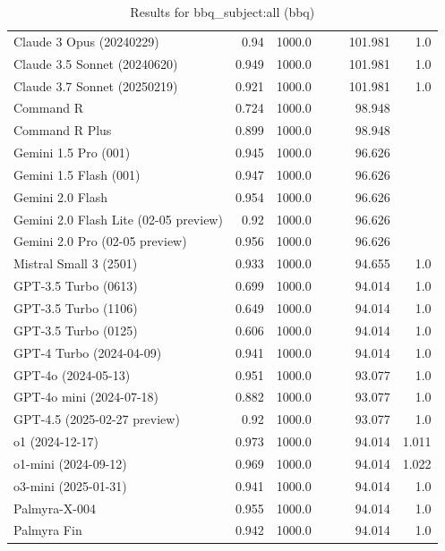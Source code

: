 \begin{table}[htp]
{\begin{tabular}{lrrrrrr}
Claude 3 Opus (20240229) & 0.94 & 1000.0 &  &  & 101.981 & 1.0 \\
Claude 3.5 Sonnet (20240620) & 0.949 & 1000.0 &  &  & 101.981 & 1.0 \\
Claude 3.7 Sonnet (20250219) & 0.921 & 1000.0 &  &  & 101.981 & 1.0 \\
Command R & 0.724 & 1000.0 &  &  & 98.948 &  \\
Command R Plus & 0.899 & 1000.0 &  &  & 98.948 &  \\
Gemini 1.5 Pro (001) & 0.945 & 1000.0 &  &  & 96.626 &  \\
Gemini 1.5 Flash (001) & 0.947 & 1000.0 &  &  & 96.626 &  \\
Gemini 2.0 Flash & 0.954 & 1000.0 &  &  & 96.626 &  \\
Gemini 2.0 Flash Lite (02-05 preview) & 0.92 & 1000.0 &  &  & 96.626 &  \\
Gemini 2.0 Pro (02-05 preview) & 0.956 & 1000.0 &  &  & 96.626 &  \\
Mistral Small 3 (2501) & 0.933 & 1000.0 &  &  & 94.655 & 1.0 \\
GPT-3.5 Turbo (0613) & 0.699 & 1000.0 &  &  & 94.014 & 1.0 \\
GPT-3.5 Turbo (1106) & 0.649 & 1000.0 &  &  & 94.014 & 1.0 \\
GPT-3.5 Turbo (0125) & 0.606 & 1000.0 &  &  & 94.014 & 1.0 \\
GPT-4 Turbo (2024-04-09) & 0.941 & 1000.0 &  &  & 94.014 & 1.0 \\
GPT-4o (2024-05-13) & 0.951 & 1000.0 &  &  & 93.077 & 1.0 \\
GPT-4o mini (2024-07-18) & 0.882 & 1000.0 &  &  & 93.077 & 1.0 \\
GPT-4.5 (2025-02-27 preview) & 0.92 & 1000.0 &  &  & 93.077 & 1.0 \\
o1 (2024-12-17) & 0.973 & 1000.0 &  &  & 94.014 & 1.011 \\
o1-mini (2024-09-12) & 0.969 & 1000.0 &  &  & 94.014 & 1.022 \\
o3-mini (2025-01-31) & 0.941 & 1000.0 &  &  & 94.014 & 1.0 \\
Palmyra-X-004 & 0.955 & 1000.0 &  &  & 94.014 & 1.0 \\
Palmyra Fin & 0.942 & 1000.0 &  &  & 94.014 & 1.0 \\
\bottomrule
\end{tabular}}
\caption{Results for bbq_subject:all (bbq)}
\label{fig:bbq_subject:all (bbq)}
\end{table}